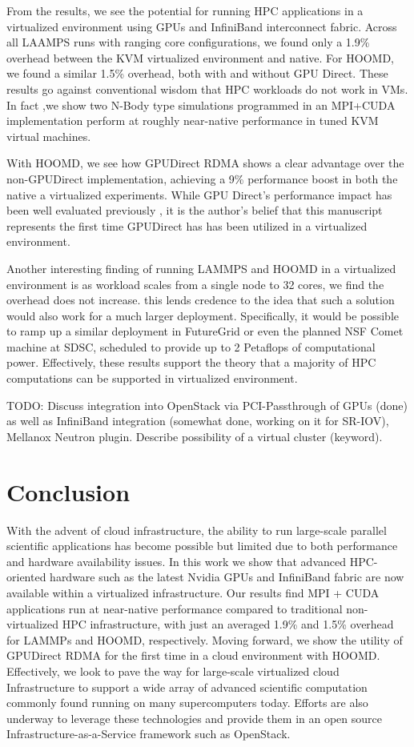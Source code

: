 \documentclass{sigplanconf}
\begin{document}
From the results, we see the potential for running HPC applications in a virtualized environment using GPUs and InfiniBand interconnect fabric. Across all LAAMPS runs with ranging core configurations, we found only a 1.9\% overhead between the KVM virtualized environment and native. For HOOMD, we found a similar 1.5\% overhead, both with and without GPU Direct. These results go against conventional wisdom that HPC workloads do not work in VMs. In fact ,we show two N-Body type simulations programmed in an MPI+CUDA implementation perform at roughly near-native performance in tuned KVM virtual machines.  

With HOOMD, we see how GPUDirect RDMA shows a clear advantage over the non-GPUDirect implementation, achieving a 9\% performance boost in both the native a virtualized experiments.  While GPU Direct's performance impact has been well evaluated previously \cite{GPUDirect}, it is the author's belief that this manuscript represents the first time GPUDirect has has been utilized in a virtualized environment.  

Another interesting finding of running LAMMPS and HOOMD in a virtualized environment is as workload scales from a single node to 32 cores, we find the overhead does not increase. this lends credence to the idea that such a solution would also work for a much larger deployment. Specifically, it would be possible to ramp up a similar deployment in FutureGrid \cite{fox2013futuregrid} or even the planned NSF Comet machine at SDSC, scheduled to provide up to 2 Petaflops of computational power. Effectively, these results support the theory that a majority of HPC computations can be supported in virtualized environment. 

TODO: Discuss integration into OpenStack via PCI-Passthrough of GPUs (done) as well as InfiniBand integration (somewhat done, working on it for SR-IOV), Mellanox Neutron plugin. Describe possibility of a virtual cluster (keyword).  

\section{Conclusion}

With the advent of cloud infrastructure, the ability to run large-scale parallel scientific applications has become possible but limited due to both performance and hardware availability issues. In this work we show that advanced HPC-oriented hardware such as the latest Nvidia GPUs and InfiniBand fabric are now available within a virtualized infrastructure. Our results find MPI + CUDA applications run at near-native performance compared to traditional non-virtualized HPC infrastructure, with just an averaged 1.9\% and 1.5\% overhead for LAMMPs and HOOMD, respectively. Moving forward, we show the utility of GPUDirect RDMA for the first time in a cloud environment with HOOMD.  Effectively, we look to pave the way for large-scale virtualized cloud Infrastructure to support a wide array of advanced scientific computation commonly found running on many supercomputers today.  Efforts are also underway to leverage these technologies and provide them in an open source Infrastructure-as-a-Service framework such as OpenStack.  
\end{document}
